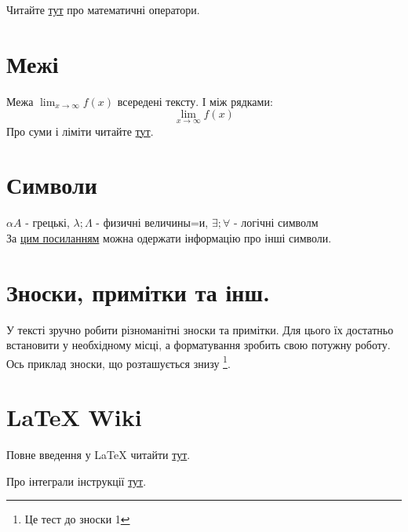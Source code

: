 Читайте \href{https://www.overleaf.com/learn/latex/Operators}{тут} про математичні оператори.

\section{Межі}
    
    Межа \(\lim_{x\to\infty} f(x)\) всередені тексту.
    І між рядками:
    \[
    \lim_{x\to\infty} f(x)
    \]
Про суми і ліміти читайте 
\href{https://www.overleaf.com/learn/latex/Integrals,_sums_and_limits#Sums_and_products}{тут}.

\section{Символи}
$\alpha A$ - грецькі,  $ \lambda; \Lambda$ - физичні величины=и, $\exists; \forall$ - логічні символм\\
За \href{https://www.overleaf.com/learn/latex/List_of_Greek_letters_and_math_symbols}{цим посиланням} можна одержати інформацію про інші символи. 

\section{Зноски, примітки та інш.}
У тексті зручно робити різноманітні зноски та примітки. Для цього їх достатньо встановити у необхідному місці, а форматування зробить свою потужну роботу. Ось приклад зноски, що розташується знизу \footnote{Це тест до зноски 1}. 

\section{{\LaTeX} Wiki}
Повне введення у {\LaTeX} читайти \href{https://www.texlive.info/CTAN/info/lshort/russian/lshortru.pdf}{тут}.

Про інтеграли інструкції 
\href{https://www.overleaf.com/learn/latex/Integrals,_sums_and_limits#Integrals}{тут}.



